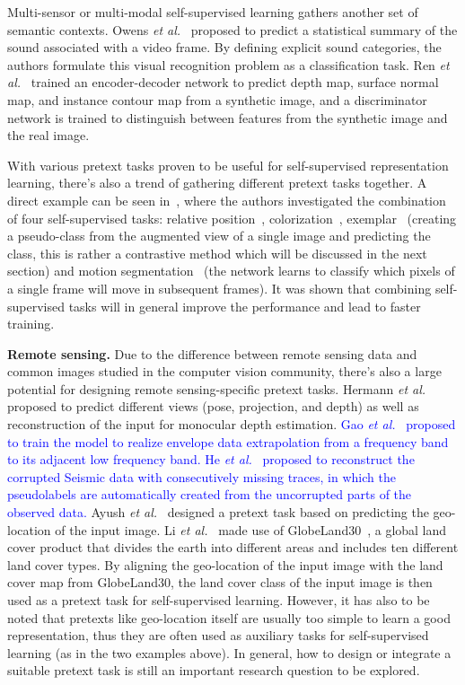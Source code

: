 \documentclass[lettersize,journal]{IEEEtran}
\newcommand{\etal}{\textit{et al.}}
\begin{document}
Multi-sensor or multi-modal self-supervised learning gathers another set of semantic contexts. Owens \etal~\cite{owens2016ambient} proposed to predict a statistical summary of the sound associated with a video frame. By defining explicit sound categories, the authors formulate this visual recognition problem as a classification task. Ren \etal~\cite{ren2018cross} trained an encoder-decoder network to predict depth map, surface normal map, and instance contour map from a synthetic image, and a discriminator network is trained to distinguish between features from the synthetic image and the real image.


With various pretext tasks proven to be useful for self-supervised representation learning, there's also a trend of gathering different pretext tasks together. A direct example can be seen in~\cite{doersch2017multi}, where the authors investigated the combination of four self-supervised tasks: relative position~\cite{doersch2015unsupervised}, colorization~\cite{zhang2016colorful}, exemplar~\cite{dosovitskiy2014discriminative} (creating a pseudo-class from the augmented view of a single image and predicting the class, this is rather a contrastive method which will be discussed in the next section) and motion segmentation~\cite{pathak2017learning} (the network learns to classify which pixels of a single frame will move in subsequent frames). It was shown that combining self-supervised tasks will in general improve the performance and lead to faster training.


\textbf{Remote sensing.} Due to the difference between remote sensing data and common images studied in the computer vision community, there's also a large potential for designing remote sensing-specific pretext tasks. Hermann \etal~\cite{hermann2020self} proposed to predict different views (pose, projection, and depth) as well as reconstruction of the input for monocular depth estimation. 
\textcolor{blue}{Gao \etal~\cite{gao2022self} proposed to train the model to realize envelope data extrapolation from a frequency band to its adjacent low frequency band. He \etal~\cite{huang2022self} proposed to reconstruct the corrupted Seismic data with consecutively missing traces, in which the pseudolabels are automatically created from the uncorrupted parts of the observed data.} 
Ayush \etal~\cite{ayush2020geography} designed a pretext task based on predicting the geo-location of the input image. Li \etal~\cite{li2021geographical} made use of GlobeLand30~\cite{jun2014open}, a global land cover product that divides the earth into different areas and includes ten different land cover types. By aligning the geo-location of the input image with the land cover map from GlobeLand30, the land cover class of the input image is then used as a pretext task for self-supervised learning. However, it has also to be noted that pretexts like geo-location itself are usually too simple to learn a good representation, thus they are often used as auxiliary tasks for self-supervised learning (as in the two examples above). In general, how to design or integrate a suitable pretext task is still an important research question to be explored.
\end{document}

